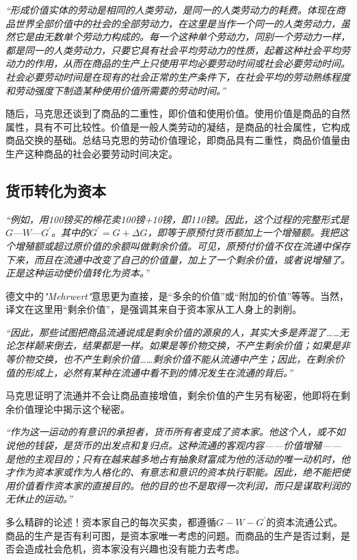 \documentclass[a4paper]{article}
\begin{document}
\emph{“形成价值实体的劳动是相同的人类劳动，是同一的人类劳动力的耗费。体现在商品世界全部价值中的社会的全部劳动力，在这里是当作一个同一的人类劳动力，虽然它是由无数单个劳动力构成的。每一个这种单个劳动力，同别一个劳动力一样，都是同一的人类劳动力，只要它具有社会平均劳动力的性质，起着这种社会平均劳动力的作用，从而在商品的生产上只使用平均必要劳动时间或社会必要劳动时间。社会必要劳动时间是在现有的社会正常的生产条件下，在社会平均的劳动熟练程度和劳动强度下制造某种使用价值所需要的劳动时间。”}

随后，马克思还谈到了商品的二重性，即价值和使用价值。使用价值是商品的自然属性，具有不可比较性。价值是一般人类劳动的凝结，是商品的社会属性，它构成商品交换的基础。总结马克思的劳动价值理论，即商品具有二重性，商品价值量由生产这种商品的社会必要劳动时间决定。
\subsection{货币转化为资本}
\emph{“例如，用100镑买的棉花卖100镑+10镑，即110镑。因此，这个过程的完整形式是$G—W—G^\prime$。其中的$G^\prime=G+\Delta G$，即等于原预付货币额加上一个增殖额。我把这个增殖额或超过原价值的余额叫做剩余价值。可见，原预付价值不仅在流通中保存下来，而且在流通中改变了自己的价值量，加上了一个剩余价值，或者说增殖了。正是这种运动使价值转化为资本。”}

德文中的\emph{"Mehrwert"}意思更为直接，是“多余的价值”或“附加的价值”等等。当然，译文在这里用“剩余价值”，是强调其来自于资本家从工人身上的剥削。

\emph{“因此，那些试图把商品流通说成是剩余价值的源泉的人，其实大多是弄混了……无论怎样颠来倒去，结果都是一样。如果是等价物交换，不产生剩余价值；如果是非等价物交换，也不产生剩余价值……剩余价值不能从流通中产生；因此，在剩余价值的形成上，必然有某种在流通中看不到的情况发生在流通的背后。”}

马克思证明了流通并不会让商品直接增值，剩余价值的产生另有秘密，他即将在剩余价值理论中揭示这个秘密。

\emph{“作为这一运动的有意识的承担者，货币所有者变成了资本家。他这个人，或不如说他的钱袋，是货币的出发点和复归点。这种流通的客观内容——价值增殖——是他的主观目的；只有在越来越多地占有抽象财富成为他的活动的唯一动机时，他才作为资本家或作为人格化的、有意志和意识的资本执行职能。因此，绝不能把使用价值看作资本家的直接目的。他的目的也不是取得一次利润，而只是谋取利润的无休止的运动。”}

多么精辟的论述！资本家自己的每次买卖，都遵循$G-W-G^\prime$的资本流通公式。商品的生产是否有利可图，是资本家唯一考虑的问题。而商品的生产是否过剩，是否会造成社会危机，资本家没有兴趣也没有能力去考虑。
\end{document}
